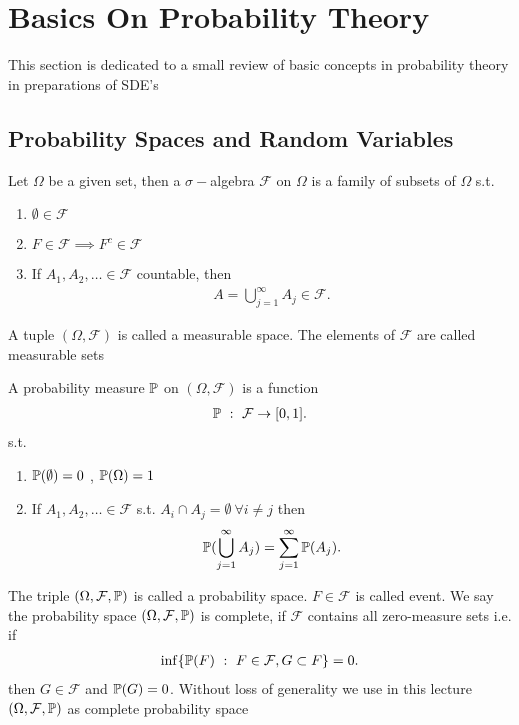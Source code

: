 \section{Basics On Probability Theory}
This section is dedicated to a small review of basic concepts 
in probability theory in preparations of SDE's
\subsection{Probability Spaces and Random Variables}
\begin{definition}
 Let $\Omega $  be a given set, then a $\sigma-$algebra $\mathcal{F}$ on $\Omega $ is a
 family of subsets of $\Omega $ s.t.
 \begin{enumerate}
   \item $\emptyset \in  \mathcal{F}$
   \item $F \in  \mathcal{F} \implies F^{c} \in  \mathcal{F} $
   \item If $A_{1},A_{2},\ldots \in \mathcal{F}$ countable, then 
     \begin{align*}
       A = \bigcup_{j=1}^{\infty} A_j \in \mathcal{F}
     .\end{align*}
 \end{enumerate}
\end{definition}
\begin{definition}
 A tuple $(\Omega ,\mathcal{F})$  is called a measurable space. The elements of $\mathcal{F}$ are 
 called measurable sets 
\end{definition}
\begin{definition}
 A probability measure $\P$ on $(\Omega ,\mathcal{F})$  is a function 
 \begin{align*}
   \P \ : \ \mathcal{F} \to [0,1]
 .\end{align*}
 s.t.
 \begin{enumerate}
   \item $\P(\emptyset) = 0$ , $\P(\Omega ) = 1$
   \item If $A_{1},A_{2},\ldots \in \mathcal{F}$ s.t. $A_i \cap A_j = \emptyset \ \forall  i \neq j$  then
     \begin{align*}
       \P(\bigcup_{j=1}^{\infty} A_j ) = \sum_{j=1}^{\infty} \P(A_j) 
     .\end{align*}
 \end{enumerate}
\end{definition}
\begin{definition}
 The triple $(\Omega ,\mathcal{F},\P)$  is called a probability space. $F \in  \mathcal{F}$ is called
 event. We say the probability space $(\Omega ,\mathcal{F},\P)$ is complete, if $\mathcal{F}$ contains all zero-measure sets i.e.
 if 
 \begin{align*}
  \inf \{\P(F) \ : \ F \in  \mathcal{F},G \subset  F\}  = 0
 .\end{align*}
 then $G \in  \mathcal{F}$ and $\P(G) = 0$. Without loss of generality we use in this lecture $(\Omega ,\mathcal{F},\P)$
 as complete probability space
\end{definition}
